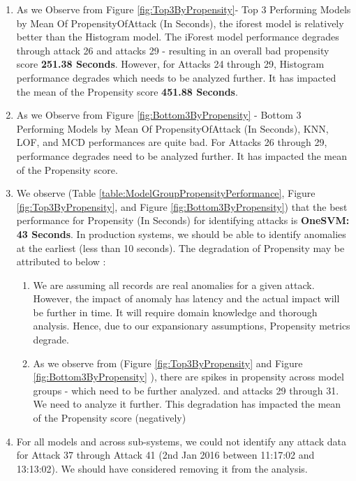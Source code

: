 \documentclass{article}
\begin{document}
\begin{enumerate}
\begin{enumerate}
            \item As we Observe from Figure \ref{fig:Top3ByPropensity}- Top 3 Performing Models by Mean Of PropensityOfAttack (In Seconds), the iforest model is relatively better than the Histogram model. The iForest model performance degrades through attack 26 and attacks 29 - resulting in an overall bad propensity score \textbf{251.38 Seconds}.  However, for Attacks 24 through 29, Histogram performance degrades which needs to be analyzed further. It has impacted the mean of the Propensity score \textbf{451.88 Seconds}. 
    
            \item  As we Observe from Figure \ref{fig:Bottom3ByPropensity} - Bottom 3 Performing Models by Mean Of PropensityOfAttack (In Seconds), KNN, LOF, and MCD performances are quite bad. For Attacks 26 through 29, performance degrades need to be analyzed further. It has  impacted the mean of the Propensity score.
            
            \item  We observe (Table \ref{table:ModelGroupPropensityPerformance}, Figure \ref{fig:Top3ByPropensity}, and Figure \ref{fig:Bottom3ByPropensity}) that the best performance for Propensity (In Seconds) for identifying attacks is \textbf{OneSVM: 43 Seconds}. In production systems, we should be able to identify anomalies at the earliest (less than 10 seconds). The degradation of Propensity may be attributed to below :
            

            \begin{enumerate}
                \item We are assuming all records are real anomalies for a given attack. However, the impact of anomaly has latency and the actual impact will be further in time. It will require domain knowledge and thorough analysis. Hence, due to our expansionary assumptions, Propensity metrics degrade.
    
                \item As we observe from (Figure \ref{fig:Top3ByPropensity} and Figure \ref{fig:Bottom3ByPropensity} ), there are spikes in propensity across model groups - which need to be further analyzed.  and attacks 29 through 31. We need to analyze it further. This degradation has impacted the mean of the Propensity score (negatively)
     
            \end{enumerate}

            \item For all models and across sub-systems, we could not identify any attack data for Attack 37 through Attack 41 (2nd Jan 2016 between 11:17:02 and 13:13:02). We should have considered removing it from the analysis.
            

\end{enumerate}
\end{enumerate}
\end{document}
